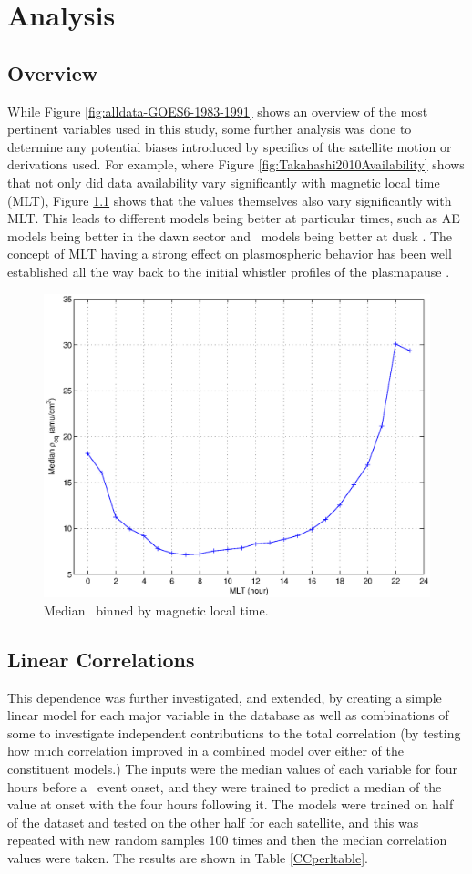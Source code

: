 \chapter[Analysis]{Analysis}

\section{Overview}
While Figure \ref{fig:alldata-GOES6-1983-1991} shows an overview of the most pertinent variables used in this study, some further analysis was done to determine any potential biases introduced by specifics of the satellite motion or derivations used. For example, where Figure \ref{fig:Takahashi2010Availability} shows that not only did data availability vary significantly with magnetic local time (MLT), Figure \ref{fig:ByHourExample} shows that the values themselves also vary significantly with MLT.  This leads to different models being better at particular times, such as AE models being better in the dawn sector and \dst\ models being better at dusk \citep{OBrien2003EmpiricalPlasmapause}. The concept of MLT having a strong effect on plasmospheric behavior has been well established all the way back to the initial whistler profiles of the plasmapause \citep{Carpenter1966WhistlerStudiesPlasmapause}.

\begin{figure}[htp!]
\centering
\includegraphics[width=0.7\linewidth]{Figures/rhoMLT.eps}
\caption{Median \req\ binned by magnetic local time.}
\label{fig:ByHourExample}
\end{figure}


\section{Linear Correlations}
This dependence was further investigated, and extended, by creating a simple linear model for each major variable in the database as well as combinations of some to investigate independent contributions to the total correlation (by testing how much correlation improved in a combined model over either of the constituent models.)  The inputs were the median values of each variable for four hours before a \dst\ event onset, and they were trained to predict a median of the value at onset with the four hours following it. The models were trained on half of the dataset and tested on the other half for each satellite, and this was repeated with new random samples 100 times and then the median correlation values were taken. The results are shown in Table \ref{CCperltable}.


